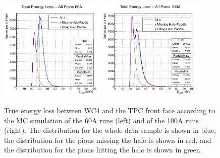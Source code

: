 

\begin{figure}[hbpt]
\centering
\includegraphics[width=0.45\textwidth]{Chapter-5/Images/E_loss60A.png}
\includegraphics[width=0.45\textwidth]{Chapter-5/Images/E_loss100A.png}
\caption{True energy loss between WC4 and the TPC front face according to the MC simulation of the 60A runs (left) and of the 100A runs (right). The distribution for the whole data sample is shown in blue, the distribution for the pions missing the halo is shown in red, and the distribution for the pions hitting the halo is shown in green.  }
\label{fig:ELoss60A}
\end{figure}

